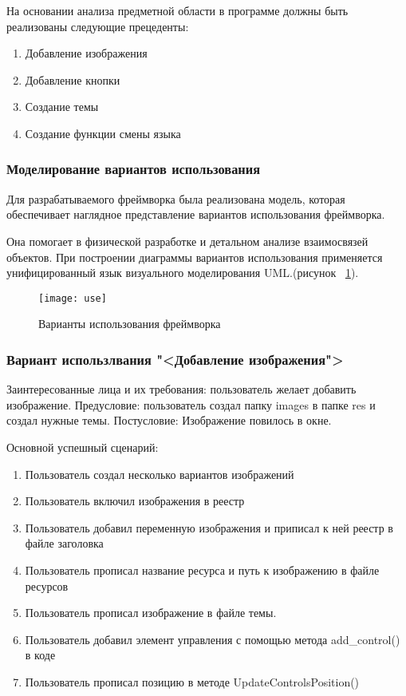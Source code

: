 На основании анализа предметной области в программе должны быть реализованы следующие прецеденты:
\begin{enumerate}
	\item Добавление изображения
	\item Добавление кнопки
	\item Создание темы
	\item Создание функции смены языка
\end{enumerate}

\subsubsection{Моделирование вариантов использования}

Для разрабатываемого фреймворка была реализована модель, которая обеспечивает наглядное представление вариантов использования фреймворка.

Она помогает в физической разработке и детальном анализе взаимосвязей объектов. При построении диаграммы вариантов использования применяется унифицированный язык визуального моделирования UML\cite{uml}.(рисунок ~\ref{use:image}).

\begin{figure}[ht]
	\texttt{[image: use]}
	\caption{Варианты использования фреймворка}
	\label{use:image}
\end{figure}

\subsubsection{Вариант использлвания "<Добавление изображения">}
Заинтересованные лица и их требования: пользователь желает добавить изображение.
Предусловие: пользователь создал папку images в папке res и создал нужные темы.
Постусловие: Изображение повилось в окне.

Основной успешный сценарий:
\begin{enumerate}
	\item Пользователь создал несколько вариантов изображений
	\item Пользователь включил изображения в реестр
	\item Пользователь добавил переменную изображения и приписал к ней реестр в файле заголовка
	\item Пользователь прописал название ресурса и путь к изображению в файле ресурсов
	\item Пользователь прописал изображение в файле темы.
	\item Пользователь добавил элемент управления с помощью метода add{\_}control() в коде
	\item Пользователь прописал позицию в методе UpdateControlsPosition()
\end{enumerate}


